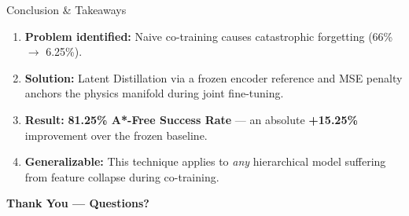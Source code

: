 \documentclass{beamer}
\begin{document}
\begin{frame}{Conclusion \& Takeaways}
    \begin{enumerate}
        \item \textbf{Problem identified:} Naive co-training causes catastrophic forgetting (66\% $\to$ 6.25\%).
        \vspace{0.3cm}
        \item \textbf{Solution:} Latent Distillation via a frozen encoder reference and MSE penalty anchors the physics manifold during joint fine-tuning.
        \vspace{0.3cm}
        \item \textbf{Result:} \textcolor{successgreen}{\textbf{81.25\% A*-Free Success Rate}} --- an absolute \textbf{+15.25\%} improvement over the frozen baseline.
        \vspace{0.3cm}
        \item \textbf{Generalizable:} This technique applies to \textit{any} hierarchical model suffering from feature collapse during co-training.
    \end{enumerate}

    \vspace{0.8cm}
    \begin{center}
        \LARGE \textbf{Thank You --- Questions?}
    \end{center}
\end{frame}
\end{document}
